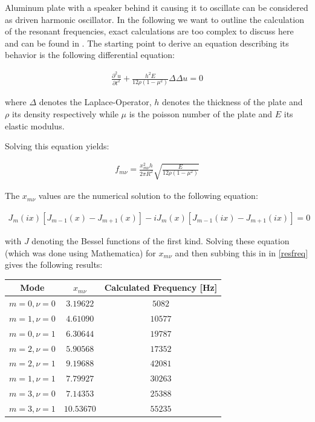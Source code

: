 Aluminum plate with a speaker behind it causing it to oscillate can be considered as driven harmonic oscillator. In the following we want to outline the calculation of the resonant frequencies, exact calculations are too complex to discuss here and can be found in \cite{staats}.
The starting point to derive an equation describing its behavior is the following differential equation:

\begin{align}
\frac{\partial^2 u}{\partial t^2}+\frac{h^2E}{12\rho(1-\mu^2)}\Delta\Delta u=0
\end{align}

where $\Delta$ denotes the Laplace-Operator, $h$ denotes the thickness of the plate and $\rho$ its density respectively while $\mu$ is the poisson number of the plate and $E$ its elastic modulus.

Solving this equation yields:

\begin{align}
f_{m\nu}=\frac{x_{m\nu}^2h}{2\pi R^2}\sqrt{\frac{E}{12\rho(1-\mu^2)}} \label{resfreq}
\end{align}

The $x_{m\nu}$ values are the numerical solution to the following equation:

\begin{align}
J_m(ix)\left[ J_{m-1}(x) - J_{m+1}(x)  \right]  - iJ_m(x)\left[ J_{m-1}(ix) - J_{m+1}(ix)  \right] = 0
\end{align}

with $J$ denoting the Bessel functions of the first kind. Solving these equation (which was done using Mathematica) for $x_{m\nu}$ and then subbing this in in \ref{resfreq} gives the following results:

{\centering{}
	\begin{tabular}{c|c|c}
		Mode 		& $x_{m\nu}$ & Calculated Frequency [Hz] 	 \\ \hline\hline
		$m=0,\nu=0$	&$3.19622$   &$5082$						\\ \hline
		$m=1,\nu=0$	& $4.61090$  & $10577$					\\ \hline
		$m=0,\nu=1$	& $6.30644$  & $19787$					\\ \hline
		$m=2,\nu=0$	& $5.90568$  & $17352$					\\ \hline
		$m=2,\nu=1$	& $9.19688$  & $42081$					\\ \hline
		$m=1,\nu=1$	& $7.79927$  & $30263$				     \\ \hline
		$m=3,\nu=0$	& $7.14353$  & $25388$                \\ \hline
     	$m=3,\nu=1$	& $10.53670$ & $55235$
	\end{tabular} }\vskip 0.2cm

